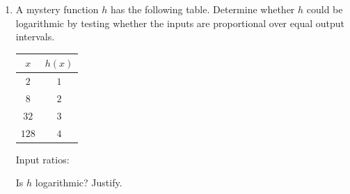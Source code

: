 \documentclass[10pt]{article}
\begin{document}
\begin{tcolorbox}[colback=white, colframe=black!40,
    title=\textbf{Tier E --- Extension},
    fonttitle=\bfseries, arc=2mm, left=3mm, right=3mm, top=2mm, bottom=2mm]
\begin{enumerate}[leftmargin=1.8em, itemsep=10pt]
\vspace{4pt}
Are the inputs of $g$ proportional? \blank{2cm} \quad This confirms EK 2.11.A.3.

\item A mystery function $h$ has the following table. Determine whether $h$ could be
      logarithmic by testing whether the inputs are proportional over equal output intervals.

\vspace{4pt}
\begin{center}
\renewcommand{\arraystretch}{1.8}
\begin{tabular}{|c|c|}
\hline
\rowcolor{sky}
$x$ & $h(x)$ \\
\hline
$2$  & $1$ \\
\hline
$8$  & $2$ \\
\hline
$32$ & $3$ \\
\hline
$128$& $4$ \\
\hline
\end{tabular}
\end{center}

\vspace{4pt}
Input ratios: \blank{5cm}

\vspace{4pt}
Is $h$ logarithmic? Justify. 

\end{enumerate}
\end{tcolorbox}
\end{document}
